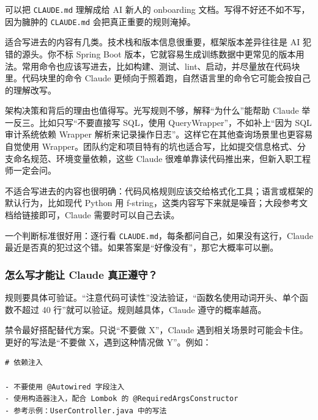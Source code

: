 \documentclass[10pt,a4paper]{ctexart}
\begin{document}
可以把 \texttt{CLAUDE.md} 理解成给 AI 新人的 onboarding 文档。写得不好还不如不写，因为臃肿的 \texttt{CLAUDE.md} 会把真正重要的规则淹掉。



适合写进去的内容有几类。技术栈和版本信息很重要，框架版本差异往往是 AI 犯错的源头。你不标 Spring Boot 版本，它就容易生成训练数据中更常见的版本用法。常用命令也应该写进去，比如构建、测试、lint、启动，并尽量放在代码块里。代码块里的命令 Claude 更倾向于照着跑，自然语言里的命令它可能会按自己的理解改写。



架构决策和背后的理由也值得写。光写规则不够，解释“为什么”能帮助 Claude 举一反三。比如只写“不要直接写 SQL，使用 QueryWrapper”，不如补上“因为 SQL 审计系统依赖 Wrapper 解析来记录操作日志”。这样它在其他查询场景里也更容易自觉使用 Wrapper。团队约定和项目特有的坑也适合写，比如提交信息格式、分支命名规范、环境变量依赖，这些 Claude 很难单靠读代码推出来，但新入职工程师一定会问。



不适合写进去的内容也很明确：代码风格规则应该交给格式化工具；语言或框架的默认行为，比如现代 Python 用 f-string，这类内容写下来就是噪音；大段参考文档给链接即可，Claude 需要时可以自己去读。



一个判断标准很好用：逐行看 \texttt{CLAUDE.md}，每条都问自己，如果没有这行，Claude 最近是否真的犯过这个错。如果答案是“好像没有”，那它大概率可以删。



\subsubsection{怎么写才能让 Claude 真正遵守？}


规则要具体可验证。“注意代码可读性”没法验证，“函数名使用动词开头、单个函数不超过 40 行”就可以验证。规则越具体，Claude 遵守的概率越高。



禁令最好搭配替代方案。只说“不要做 X”，Claude 遇到相关场景时可能会卡住。更好的写法是“不要做 X，遇到这种情况做 Y”。例如：



\begin{lstlisting}
# 依赖注入

- 不要使用 @Autowired 字段注入
- 使用构造器注入，配合 Lombok 的 @RequiredArgsConstructor
- 参考示例：UserController.java 中的写法
\end{lstlisting}
\end{document}
